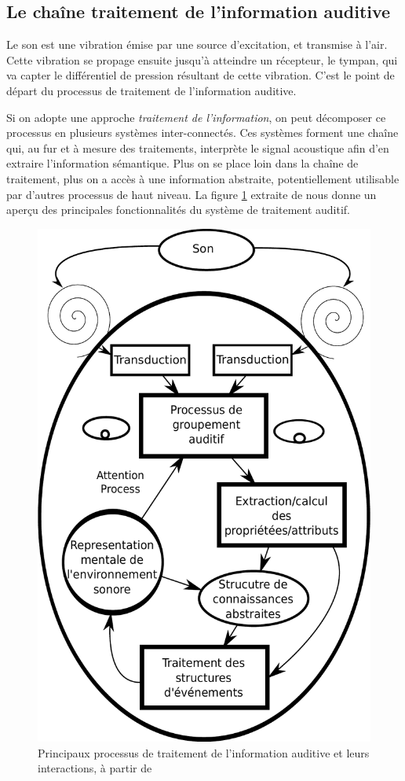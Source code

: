 \subsection{Le chaîne traitement de l'information auditive}
\label{sec:chaineTaite}

Le son est une vibration émise par une source d'excitation, et transmise à l'air. Cette vibration se propage ensuite jusqu'à atteindre un récepteur, le tympan, qui va capter le différentiel de pression résultant de cette vibration. C'est le point de départ du processus de traitement de l'information auditive. 

Si on adopte une approche \emph{traitement de l'information}, on peut décomposer ce processus en plusieurs systèmes inter-connectés. Ces systèmes forment une chaîne qui, au fur et à mesure des traitements, interprète le signal acoustique afin d'en extraire l'information sémantique. Plus on se place loin dans la chaîne de traitement, plus on a accès à une information abstraite, potentiellement utilisable par d'autres processus de haut niveau. La figure \ref{fig:traitementSonMcAdamsBigand} extraite de \citep{mcadams1994penser} nous donne un aperçu des principales fonctionnalités du système de traitement auditif.

\begin{figure}[bth]
        \myfloatalign
        \includegraphics[width=.6\linewidth]{gfx/traitementSonMcAdamsBigand}
        \caption[Principaux processus de traitement de l'information auditive et leurs interactions]{Principaux processus de traitement de l'information auditive et leurs interactions, à partir de \citep{mcadams1994penser}}\label{fig:traitementSonMcAdamsBigand}
\end{figure}

